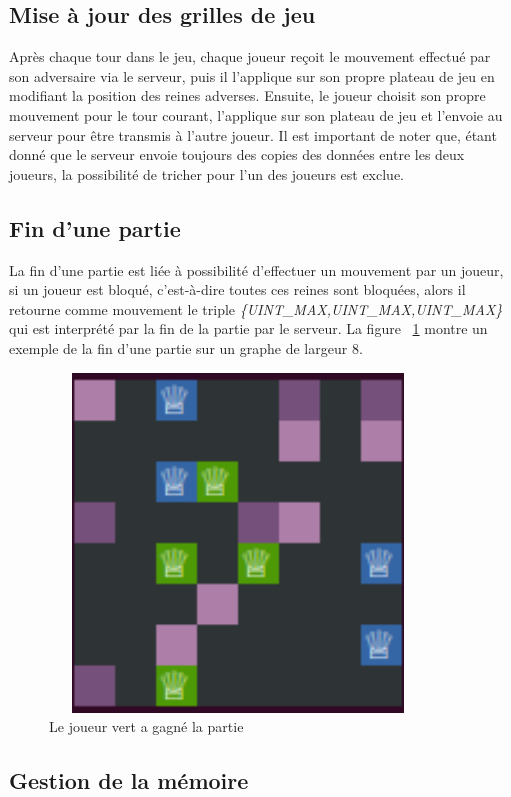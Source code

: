 \documentclass[11pt]{article}
\begin{document}
        \subsection{Mise à jour des grilles de jeu}
        Après chaque tour dans le jeu, chaque joueur reçoit le mouvement effectué par son adversaire via le serveur, puis il l'applique sur son propre plateau de jeu en modifiant la position des reines adverses. Ensuite, le joueur choisit son propre mouvement pour le tour courant, l'applique sur son plateau de jeu et l'envoie au serveur pour être transmis à l'autre joueur. Il est important de noter que, étant donné que le serveur envoie toujours des copies des données entre les deux joueurs, la possibilité de tricher pour l'un des joueurs est exclue.
        \subsection{Fin d'une partie}
        La fin d'une partie est liée à possibilité d'effectuer un mouvement par un joueur, si un joueur est bloqué, c'est-à-dire toutes ces reines sont bloquées, alors il retourne comme mouvement le triple \textit{\{UINT\_MAX,UINT\_MAX,UINT\_MAX\}} qui est interprété par la fin de la partie par le serveur. La figure ~\ref{fig:gameover} montre un exemple de la fin d'une partie sur un graphe de largeur 8.
        \begin{figure}[h]
                \centering
                \includegraphics[height = 9cm, width = 10cm]{fin_de_la_partie.png}
                \caption{Le joueur vert a gagné la partie}
                \label{fig:gameover}
            \end{figure}
        \subsection{Gestion de la mémoire}
        
\end{document}
